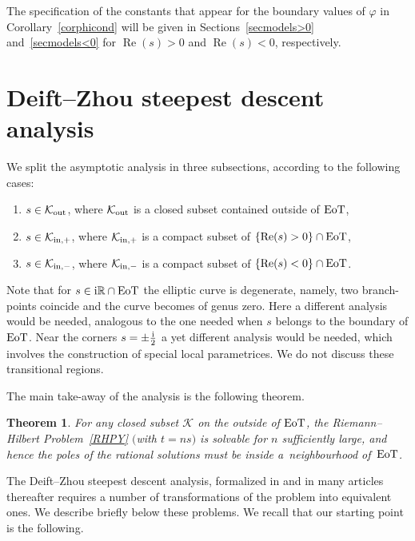 \documentclass[10pt,a4paper]{amsart}
\numberwithin{equation}{section}
\newtheorem{Theorem}{Theorem}[section]
\theoremstyle{definition}
\def\R{{\mathbb R}}
\def \Re{\operatorname{Re} }
\begin{document}
The specification of the constants that appear for the boundary values of $\varphi$ in Corollary~\ref{corphicond} will be given in Sections~\ref{secmodels>0} and~\ref{secmodels<0} for $\Re(s)>0$ and $\Re(s)<0$, respectively.

\section{Deift--Zhou steepest descent analysis}
 We split the asymptotic analysis in three subsections, according to the following cases:
 \begin{enumerate}\itemsep=0pt
 \item[(1)] $s\in \mathcal K_{\rm out}$, where ${\mathcal K_{\rm out}}$ is a closed subset contained outside of ${\rm EoT}$,
 \item[(2)] $s\in \mathcal K_{{\rm in},+}$, where ${\mathcal K_{{\rm in},+}}$ is a compact subset of $\{\Re (s)>0\}\cap {\rm EoT}$,
 \item[(3)] $s\in \mathcal K_{{\rm in},-}$, where ${\mathcal K_{{\rm in},-}}$ is a compact subset of $\{\Re (s)<0\}\cap {\rm EoT}$.
 \end{enumerate}
 Note that for $s\in {\rm i}\R\cap {\rm EoT}$ the elliptic curve is degenerate, namely, two branch-points coincide and the curve becomes of genus zero. Here a different analysis would be needed, analogous to the one needed when $s$ belongs to the boundary of ${\rm EoT}$. Near the corners $s=\pm \frac {\rm i}2$ a yet different analysis would be needed, which involves the construction of special local parametrices. We do not discuss these transitional regions.

The main take-away of the analysis is the following theorem.

\begin{Theorem}
For any closed subset $\mathcal K$ on the outside of ${\rm EoT}$, the Riemann--Hilbert Problem~{\rm\ref{RHPY}} $($with $t=ns)$ is solvable for $n$ sufficiently large, and hence the poles of the rational solutions must be inside a~neighbourhood of~${\rm EoT}$.
\end{Theorem}


The Deift--Zhou steepest descent analysis, formalized in \cite{DZ} and in many articles thereafter requires a number of transformations of the problem into equivalent ones. We describe briefly below these problems.
We recall that our starting point is the following.
\end{document}
